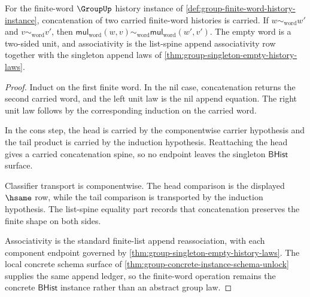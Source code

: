 \begin{theorem}
\label{thm:group-finite-word-operation-closure}
For the finite-word $\GroupUp$ history instance of
\autoref{def:group-finite-word-history-instance}, concatenation of two carried
finite-word histories is carried. If $w\sim_{\mathrm{word}}w'$ and
$v\sim_{\mathrm{word}}v'$, then
$\mathsf{mul}_{\mathrm{word}}(w,v)\sim_{\mathrm{word}}
\mathsf{mul}_{\mathrm{word}}(w',v')$. The empty word is a two-sided unit, and
associativity is the list-spine append associativity row together with the
singleton append laws of \autoref{thm:group-singleton-empty-history-laws}.
\end{theorem}
\begin{proof}
Induct on the first finite word. In the nil case, concatenation returns the
second carried word, and the left unit law is the nil append equation. The
right unit law follows by the corresponding induction on the carried word.

In the cons step, the head is carried by the componentwise carrier hypothesis
and the tail product is carried by the induction hypothesis. Reattaching the
head gives a carried concatenation spine, so no endpoint leaves the singleton
$\mathsf{BHist}$ surface.

Classifier transport is componentwise. The head comparison is the displayed
$\hsame$ row, while the tail comparison is transported by the induction
hypothesis. The list-spine equality part records that concatenation preserves
the finite shape on both sides.

Associativity is the standard finite-list append reassociation, with each
component endpoint governed by
\autoref{thm:group-singleton-empty-history-laws}. The local concrete schema
surface of \autoref{thm:group-concrete-instance-schema-unlock} supplies the same
append ledger, so the finite-word operation remains the concrete
$\mathsf{BHist}$ instance rather than an abstract group law.
\end{proof}

